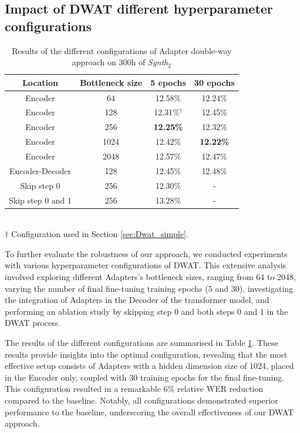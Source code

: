 \subsection{Impact of DWAT different hyperparameter configurations}
\label{sec:hyperparameter}
\begin{table}[t]
\centering
\begin{tabular}{cccc}
\hline
 Location &  Bottleneck size &  5 epochs &  30 epochs     \\ \hline
\multicolumn{1}{c}{Encoder} & 64 & 12.58\% & 12.24\% \\ 
\multicolumn{1}{c}{Encoder} & 128 &  12.31\%$^\dag$ & 12.45\%  \\ 
\multicolumn{1}{c}{Encoder} & 256  & \textbf{12.25\%} & 12.32\%  \\ 
\multicolumn{1}{c}{Encoder} & 1024 & 12.42\% & \textbf{12.22\%} \\ 
\multicolumn{1}{c}{Encoder} & 2048 & 12.57\% & 12.47\% \\ \hline
\multicolumn{1}{c}{Encoder-Decoder} & 128 & 12.45\% & 12.48\% \\ \hline
\multicolumn{1}{c}{Skip step 0} & 256 & 12.30\% & - \\ 
\multicolumn{1}{c}{Skip step 0 and 1} & 256 & 13.28\% & - \\ \hline

\end{tabular}
\\
$\dag$ Configuration used in Section \ref{sec:Dwat_simple}.
\caption{Results of the different configurations of Adapter double-way approach on 300h of \textit{Synth$_2$}}
\label{tab:config_hparams}
\end{table}
To further evaluate the robustness of our approach, we conducted experiments with various hyperparameter configurations of \ac{DWAT}. This extensive analysis involved exploring different Adapters's bottleneck sizes, ranging from 64 to 2048, varying the number of final fine-tuning training epochs (5 and 30), investigating the integration of Adapters in the Decoder of the transformer model, and performing an ablation study by skipping step 0 and both steps 0 and 1 in the \ac{DWAT} process.

The results of the different configurations are summarised in Table \ref{tab:config_hparams}. These results provide insights into the optimal configuration, revealing that the most effective setup consists of  Adapters with a hidden dimension size of 1024, placed in the Encoder only, coupled with 30 training epochs for the final fine-tuning. This configuration resulted in a remarkable 6\% relative \ac{WER} reduction compared to the baseline. Notably, all configurations demonstrated superior performance to the baseline, underscoring the overall effectiveness of our \ac{DWAT} approach.

